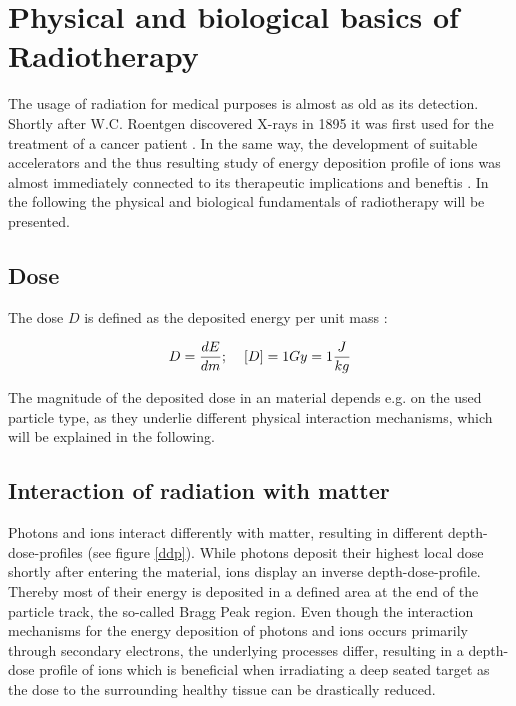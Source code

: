 \documentclass[type=dr, dr=rernat, accentcolor=tud7b,colorbacktitle, bigchapter, openright, twoside, 12pt ]{tudthesis}
\begin{document}
\section{Physical and biological basics of Radiotherapy}
\label{pbb}
The usage of radiation for medical purposes is almost as old as its detection. Shortly after W.C. Roentgen discovered X-rays in 1895 it 
was first used for the treatment of a cancer patient \cite{Hal06}. In the same way, the development of suitable accelerators and the thus 
resulting study of energy deposition profile of ions was almost immediately connected to its therapeutic implications and beneftis 
\cite{Wil46}. In the following the physical and biological fundamentals of radiotherapy will be presented.


\subsection{Dose}

The dose $D$ is defined as the deposited energy per unit mass \cite{ICRU93}:

\begin{equation}
 D = \frac{dE}{dm} ; \hspace{0.4cm} [D]= 1 Gy = 1 \frac{J}{kg}
 \label{dose}
\end{equation}

The magnitude of the deposited dose in an material depends e.g. on the used particle type, as they underlie different physical interaction 
mechanisms, which will be explained in the following. 


\subsection{Interaction of radiation with matter}

Photons and ions interact differently with matter, resulting in different depth-dose-profiles (see figure \ref{ddp}). While photons deposit 
their highest local dose shortly after entering the material, ions display an inverse depth-dose-profile. Thereby most of their energy 
is deposited in a defined area at the end of the particle track, the so-called Bragg Peak region. Even though the interaction 
mechanisms for the energy deposition of photons and ions occurs primarily through secondary electrons, the underlying processes 
differ, resulting in a depth-dose profile of ions which is beneficial when irradiating a deep seated target as the dose to the surrounding 
healthy tissue can be drastically reduced. 
\end{document}
